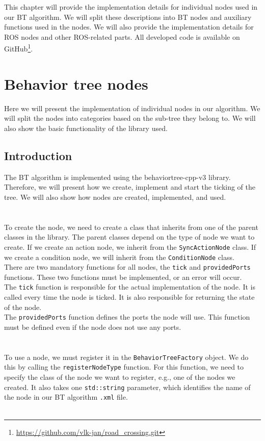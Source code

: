 This chapter will provide the implementation details for individual nodes used in our BT algorithm. We will split these descriptions into BT nodes and auxiliary functions used in the nodes. We will also provide the implementation details for ROS nodes and other ROS-related parts. All developed code is available on GitHub\footnote{\url{https://github.com/vlk-jan/road_crossing.git}}.

\section{Behavior tree nodes}
    Here we will present the implementation of individual nodes in our algorithm. We will split the nodes into categories based on the sub-tree they belong to. We will also show the basic functionality of the library used.
    \subsection{Introduction}
        The BT algorithm is implemented using the behaviortree-cpp-v3 library. Therefore, we will present how we create, implement and start the ticking of the tree. We will also show how nodes are created, implemented, and used.\\\\
        \\
            To create the node, we need to create a class that inherits from one of the parent classes in the library. The parent classes depend on the type of node we want to create. If we create an action node, we inherit from the \texttt{SyncActionNode} class. If we create a condition node, we will inherit from the \texttt{ConditionNode} class.\\
            There are two mandatory functions for all nodes, the \texttt{tick} and \texttt{providedPorts} functions. These two functions must be implemented, or an error will occur.\\
            The \texttt{tick} function is responsible for the actual implementation of the node. It is called every time the node is ticked. It is also responsible for returning the state of the node.\\
            The \texttt{providedPorts} function defines the ports the node will use. This function must be defined even if the node does not use any ports.\\\\
        \\
            To use a node, we must register it in the \texttt{BehaviorTreeFactory} object. We do this by calling the \texttt{registerNodeType} function. For this function, we need to specify the class of the node we want to register, e.g., one of the nodes we created. It also takes one \texttt{std::string} parameter, which identifies the name of the node in our BT algorithm \texttt{.xml} file.\\\\

